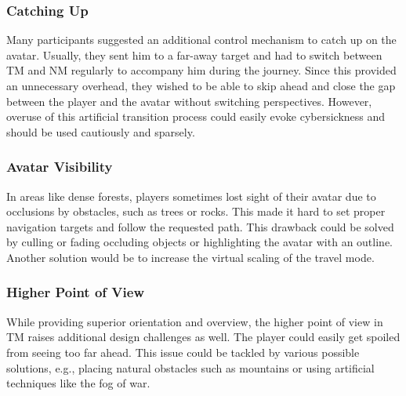 \documentclass{sigchi}
\begin{document}
\subsubsection{Catching Up}
Many participants suggested an additional control mechanism to catch up on the avatar. Usually, they sent him to a far-away target and had to switch between TM and NM regularly to accompany him during the journey. Since this provided an unnecessary overhead, they wished to be able to skip ahead and close the gap between the player and the avatar without switching perspectives. However, overuse of this artificial transition process could easily evoke cybersickness and should be used cautiously and sparsely.\par

\subsubsection{Avatar Visibility}
In areas like dense forests, players sometimes lost sight of their avatar due to occlusions by obstacles, such as trees or rocks. This made it hard to set proper navigation targets and follow the requested path. This drawback could be solved by culling or fading occluding objects or highlighting the avatar with an outline. Another solution would be to increase the virtual scaling of the travel mode. %

\subsubsection{Higher Point of View}
While providing superior orientation and overview, the higher point of view in TM raises additional design challenges as well. The player could easily get spoiled from seeing too far ahead. This issue could be tackled by various possible solutions, e.g., placing natural obstacles such as mountains or using artificial techniques like the fog of war. 
\end{document}
